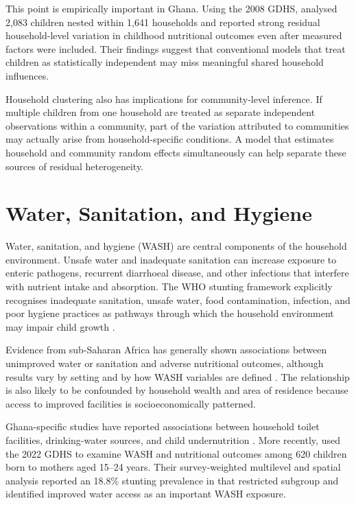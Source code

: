 This point is empirically important in Ghana. Using the 2008 GDHS, \citet{AhetoEtAl2015} analysed 2,083 children nested within 1,641 households and reported strong residual household-level variation in childhood nutritional outcomes even after measured factors were included. Their findings suggest that conventional models that treat children as statistically independent may miss meaningful shared household influences.

Household clustering also has implications for community-level inference. If multiple children from one household are treated as separate independent observations within a community, part of the variation attributed to communities may actually arise from household-specific conditions. A model that estimates household and community random effects simultaneously can help separate these sources of residual heterogeneity.

\section{Water, Sanitation, and Hygiene}

Water, sanitation, and hygiene (WASH) are central components of the household environment. Unsafe water and inadequate sanitation can increase exposure to enteric pathogens, recurrent diarrhoeal disease, and other infections that interfere with nutrient intake and absorption. The WHO stunting framework explicitly recognises inadequate sanitation, unsafe water, food contamination, infection, and poor hygiene practices as pathways through which the household environment may impair child growth \cite{WHOFramework2013}.

Evidence from sub-Saharan Africa has generally shown associations between unimproved water or sanitation and adverse nutritional outcomes, although results vary by setting and by how WASH variables are defined \cite{AkombiEtAl2017}. The relationship is also likely to be confounded by household wealth and area of residence because access to improved facilities is socioeconomically patterned.

Ghana-specific studies have reported associations between household toilet facilities, drinking-water sources, and child undernutrition \cite{AhetoEtAl2015}. More recently, \citet{OgumEtAl2026} used the 2022 GDHS to examine WASH and nutritional outcomes among 620 children born to mothers aged 15--24 years. Their survey-weighted multilevel and spatial analysis reported an 18.8\% stunting prevalence in that restricted subgroup and identified improved water access as an important WASH exposure.

